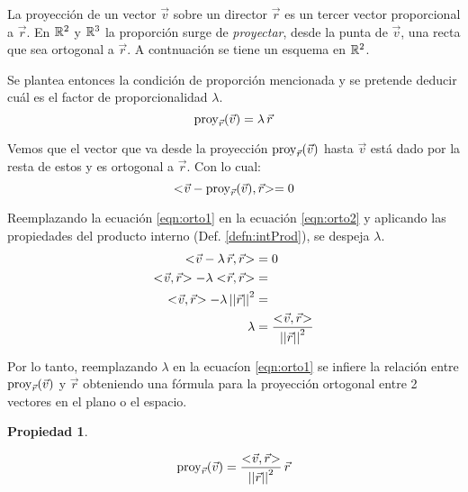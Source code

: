 \documentclass[a5paper,12pt,twoside]{book}
\newtheorem{prop}{{Propiedad}}[chapter]
\begin{document}
La proyección de un vector $\Vec{v}$ sobre un director $\Vec{r}$ es un tercer vector proporcional a $\Vec{r}$. En $\mathbb{R}^2$ y $\mathbb{R}^3$ la proporción surge de \emph{proyectar}, desde la punta de $\Vec{v}$, una recta que sea ortogonal a $\Vec{r}$. A contnuación se tiene un esquema en $\mathbb{R}^2$.

\begin{center}
    \def\svgwidth{0.6\linewidth}
    
\end{center}

Se plantea entonces la condición de proporción mencionada y se pretende deducir cuál es el factor de proporcionalidad $\lambda$.
\begin{equation}
    \operatorname{proy}_{\Vec{r}}(\Vec{v}) = \lambda \, \Vec{r}
    \label{eqn:orto1}
\end{equation}

Vemos que el vector que va desde la proyección $\operatorname{proy}_{\Vec{r}}(\Vec{v})$ hasta $\Vec{v}$ está dado por la resta de estos y es ortogonal a $\Vec{r}$. Con lo cual:
\begin{equation}
    <\hspace{-0.8mm}\Vec{v} - \operatorname{proy}_{\Vec{r}}(\Vec{v}),\Vec{r}\hspace{-0.8mm}> = 0
    \label{eqn:orto2}
\end{equation}

Reemplazando la ecuación \ref{eqn:orto1} en la ecuación \ref{eqn:orto2} y aplicando las propiedades del producto interno (Def. \ref{defn:intProd}), se despeja $\lambda$.
\begin{align*}
    \intProd{\Vec{v} - \lambda \, \Vec{r}}{\Vec{r}} &= 0
    \\
    \intProd{\Vec{v}}{\Vec{r}} - \lambda \intProd{\Vec{r}}{\Vec{r}} &=
    \\
    \intProd{\Vec{v}}{\Vec{r}} - \lambda \, \nnorm{\Vec{r}}^2 &=
    \\
    \lambda &= \frac{\intProd{\Vec{v}}{\Vec{r}}}{\nnorm{\Vec{r}}^2}
\end{align*}

Por lo tanto, reemplazando $\lambda$ en la ecuacíon \ref{eqn:orto1} se infiere la relación entre $\operatorname{proy}_{\Vec{r}}(\Vec{v})$ y $\Vec{r}$ obteniendo una fórmula para la proyección ortogonal entre 2 vectores en el plano o el espacio.

\begin{mdframed}[style=MyFrame1]
    \begin{prop}
        \label{prop:proyOrto}
    \end{prop}
    \begin{equation*}
        \operatorname{proy}_{\Vec{r}}(\Vec{v}) = \frac{<\hspace{-0.8mm}\Vec{v},\Vec{r}\hspace{-0.8mm}>}{{\left|\left| {\Vec{r}} \right|\right|}^2} \, \Vec{r}
    \end{equation*}
\end{mdframed}
\end{document}
